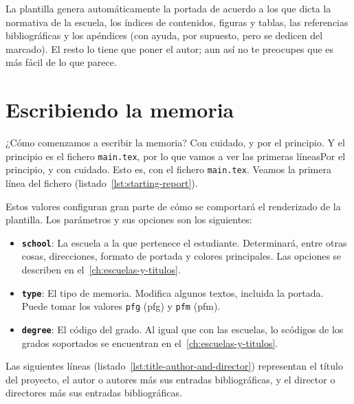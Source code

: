\documentclass[%
    school=etsisi,%
    type=pfg,%
    degree=61CD,%
]{upm-report}
\begin{document}
La plantilla genera automáticamente la portada de acuerdo a los que
dicta la normativa de la escuela, los índices de contenidos, figuras y
tablas, las referencias bibliográficas y los apéndices (con ayuda, por
supuesto, pero se dedicen del marcado). El resto lo tiene que poner el
autor; aun así no te preocupes que es más fácil de lo que parece.

\chapter{Escribiendo la memoria}

¿Cómo comenzamos a escribir la memoria? Con cuidado, y por el principio.
Y el principio es el fichero \texttt{main.tex}, por lo que vamos a ver
las primeras líneasPor el principio, y con cuidado. Esto es, con el fichero \texttt{main.tex}. Veamos la primera línea del fichero (listado~\ref{lst:starting-report}).



Estos valores configuran gran parte de cómo se comportará el renderizado
de la plantilla. Los parámetros y sus opciones son los siguientes:

\begin{itemize}
    \item \textbf{\texttt{school}}: La escuela a la que pertenece el
        estudiante. Determinará, entre otras cosas, direcciones, formato
        de portada y colores principales. Las opciones se describen en
        el~\autoref{ch:escuelas-y-titulos}.
    \item \textbf{\texttt{type}}: El tipo de memoria. Modifica algunos textos, incluida la portada. Puede tomar los valores \texttt{pfg} (\acrlong{pfg}) y \texttt{pfm}  (\acrlong{pfm}).
    \item \textbf{\texttt{degree}}: El código del grado. Al igual que
    con las escuelas, lo scódigos de los grados soportados se encuentran
    en el~\autoref{ch:escuelas-y-titulos}.
\end{itemize}

Las siguientes líneas (listado~\ref{lst:title-author-and-director})
representan el título del proyecto, el autor o autores más sus entradas
bibliográficas, y el director o directores más sus entradas
bibliográficas.


\end{document}
